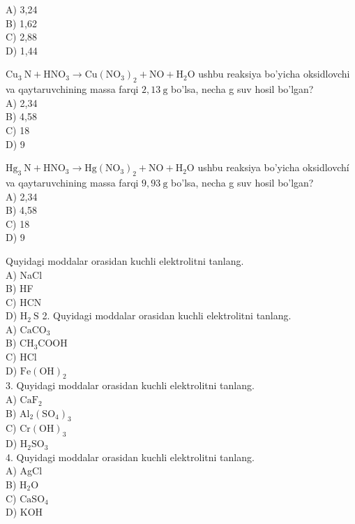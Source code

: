A) 3,24\\
B) 1,62\\
C) 2,88\\
D) 1,44
  \item $\mathrm{Cu}_{3} \mathrm{~N}+\mathrm{HNO}_{3} \rightarrow \mathrm{Cu}\left(\mathrm{NO}_{3}\right)_{2}+\mathrm{NO}+\mathrm{H}_{2} \mathrm{O}$ ushbu reaksiya bo'yicha oksidlovchi va qaytaruvchining massa farqi $2,13 \mathrm{~g}$ bo'lsa, necha g suv hosil bo'lgan?\\
A) 2,34\\
B) 4,58\\
C) 18\\
D) 9
  \item $\mathrm{Hg}_{3} \mathrm{~N}+\mathrm{HNO}_{3} \rightarrow \mathrm{Hg}\left(\mathrm{NO}_{3}\right)_{2}+\mathrm{NO}+\mathrm{H}_{2} \mathrm{O}$ ushbu reaksiya bo'yicha oksidlovchí va qaytaruvchining massa farqi $9,93 \mathrm{~g}$ bo'lsa, necha g suv hosil bo'lgan?\\
A) 2,34\\
B) 4,58\\
C) 18\\
D) 9
  \item Quyidagi moddalar orasidan kuchli elektrolitni tanlang.\\
A) NaCl\\
B) HF\\
C) HCN\\
D) $\mathrm{H}_{2} \mathrm{~S}$
2. Quyidagi moddalar orasidan kuchli elektrolitni tanlang.\\
A) $\mathrm{CaCO}_{3}$\\
B) $\mathrm{CH}_{3} \mathrm{COOH}$\\
C) HCl\\
D) $\mathrm{Fe}(\mathrm{OH})_{2}$\\
3. Quyidagi moddalar orasidan kuchli elektrolitni tanlang.\\
A) $\mathrm{CaF}_{2}$\\
B) $\mathrm{Al}_{2}\left(\mathrm{SO}_{4}\right)_{3}$\\
C) $\mathrm{Cr}(\mathrm{OH})_{3}$\\
D) $\mathrm{H}_{2} \mathrm{SO}_{3}$\\
4. Quyidagi moddalar orasidan kuchli elektrolitni tanlang.\\
A) AgCl\\
B) $\mathrm{H}_{2} \mathrm{O}$\\
C) $\mathrm{CaSO}_{4}$\\
D) KOH\\
